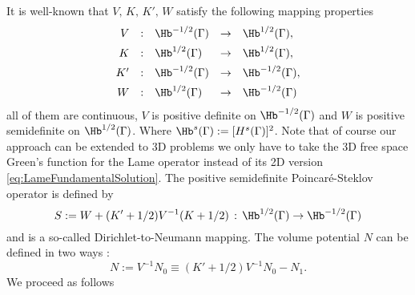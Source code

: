 It is well-known \cite{Cos88} that $V,\,K,\,K',\,W$ satisfy the following mapping properties
\begin{eqnarray*}
\begin{array}{rclrl}
V&:& \Hb^{-1/2}(\Gamma)&\rightarrow& \Hb^{1/2}(\Gamma),\\[1ex]
K&:&\Hb^{1/2}(\Gamma)&\rightarrow& \Hb^{1/2}(\Gamma),\\[1ex]
K'&:&\Hb^{-1/2}(\Gamma)&\rightarrow& \Hb^{-1/2}(\Gamma),\\[1ex]
W&:&\Hb^{1/2}(\Gamma)&\rightarrow& \Hb^{-1/2}(\Gamma)
\end{array}
\end{eqnarray*}
all of them  are continuous, $V$ is positive definite on $\Hb^{-1/2}(\Gamma)$ and $W$ is positive semidefinite on $\Hb^{1/2}(\Gamma)$. Where $\Hb^{s}(\Gamma):=[H^{s}(\Gamma)]^2$. Note that of course our approach can be extended to 3D problems we only have to take the 3D free space Green's function for the Lame operator instead of its 2D version \ref{eq:LameFundamentalSolution}. The positive semidefinite Poincar\'e-Steklov \cite{CarSt95} operator is defined by
\begin{equation}\label{eq:PoincareSteklovDef}
  S:=W+(K'+1/2)V^{-1}(K+1/2)\,:\,
  \Hb^{1/2}(\Gamma) \rightarrow \Hb^{-1/2}(\Gamma)
\end{equation}
and is a so-called Dirichlet-to-Neumann mapping. The volume potential $N$ can be defined in two ways \cite{EcStbWn99}:
\begin{equation}\label{eq:NewtonPotentialDef}
N := V^{-1} N_0 \equiv (K'+1/2) V^{-1} N_0 - N_1.
\end{equation}
We proceed as follows
